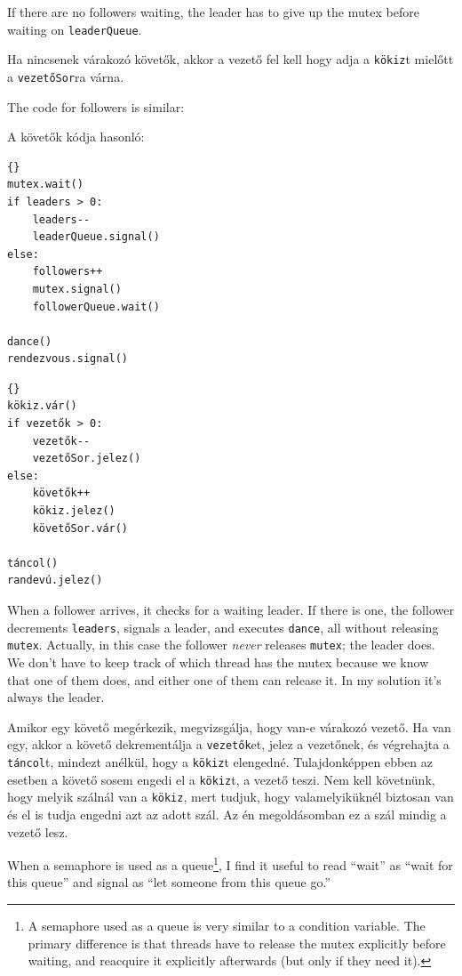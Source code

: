 \documentclass{book}
\begin{document}
If there are no followers waiting, the leader has to give up the mutex
before waiting on {\tt leaderQueue}.

Ha nincsenek várakozó követők, akkor a vezető fel kell hogy adja
a {\tt kökiz}t mielőtt a {\tt vezetőSor}ra várna.

The code for followers is similar:

A követők kódja hasonló:

\begin{lstlisting}[title={Queue solution (followers)}]{}
mutex.wait()
if leaders > 0:
    leaders--
    leaderQueue.signal()
else:
    followers++
    mutex.signal()
    followerQueue.wait()    

dance()
rendezvous.signal()
\end{lstlisting}

\begin{lstlisting}[title={Kizárólagos várakozási sor megoldás (követők)}]{}
kökiz.vár()
if vezetők > 0:
    vezetők--
    vezetőSor.jelez()
else:
    követők++
    kökiz.jelez()
    követőSor.vár()    

táncol()
randevú.jelez()
\end{lstlisting}

When a follower arrives, it checks for a waiting leader.  If there
is one, the follower decrements {\tt leaders}, signals a leader, and
executes {\tt dance}, all without releasing {\tt mutex}.  Actually,
in this case the follower {\em never} releases {\tt mutex};
the leader does.  We don't have to keep track of which thread has the
mutex because we know that one of them does, and either one of them can
release it.  In my solution it's always the leader.

Amikor egy követő megérkezik, megvizsgálja, hogy van-e várakozó vezető.
Ha van egy, akkor a követő dekrementálja a {\tt vezetők}et, jelez a vezetőnek,
és végrehajta a {\tt táncol}t, mindezt anélkül, hogy a {\tt kökiz}t elengedné.
Tulajdonképpen ebben az esetben a követő sosem engedi el a {\tt kökiz}t, a
vezető teszi. Nem kell követnünk, hogy melyik szálnál van a {\tt kökiz}, mert
tudjuk, hogy valamelyiküknél biztosan van és el is tudja engedni azt az
adott szál. Az én megoldásomban ez a szál mindig a vezető lesz. 

When a semaphore is used as a queue\footnote{A semaphore used as a
queue is very similar to a condition variable.  The primary difference
is that threads have to release the mutex explicitly before waiting,
and reacquire it explicitly afterwards (but only if they need it).},
I find it useful to read ``wait'' as ``wait for this queue'' and
signal as ``let someone from this queue go.''
\end{document}
